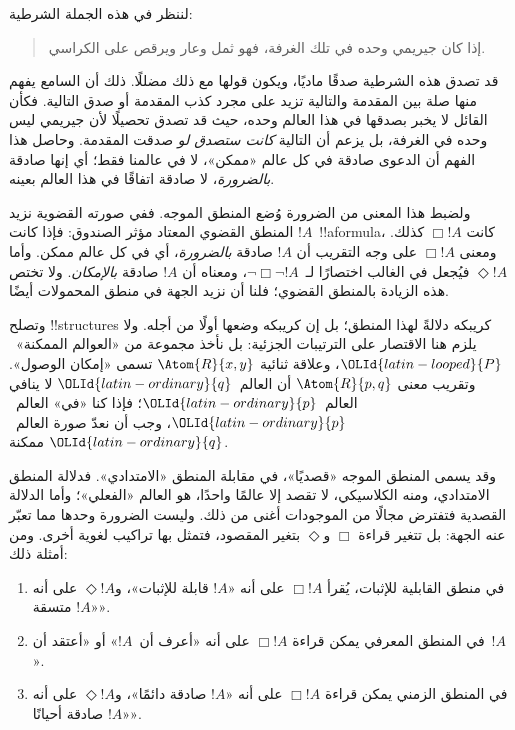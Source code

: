 \documentclass[../../../include/open-logic-section]{subfiles}
\begin{document}


لننظر في هذه الجملة الشرطية:
\begin{quote}
  إذا كان جيريمي وحده في تلك الغرفة، فهو ثمل وعار ويرقص على الكراسي.
\end{quote}
قد تصدق هذه الشرطية صدقًا ماديًا، ويكون قولها مع ذلك مضللًا.
ذلك أن السامع يفهم منها صلة بين المقدمة والتالية تزيد على مجرد
كذب المقدمة أو صدق التالية. فكأن القائل لا يخبر بصدقها في هذا
العالم وحده، حيث قد تصدق تحصيلًا لأن جيريمي ليس وحده في الغرفة،
بل يزعم أن التالية \emph{كانت ستصدق لو} صدقت المقدمة. وحاصل هذا
الفهم أن الدعوى صادقة في كل عالم «ممكن»، لا في عالمنا فقط؛ أي
إنها صادقة \emph{بالضرورة}، لا صادقة اتفاقًا في هذا العالم بعينه.

ولضبط هذا المعنى من الضرورة وُضع المنطق الموجه. ففي صورته القضوية
نزيد المنطق القضوي المعتاد مؤثر الصندوق: فإذا كانت $!A$~!!a{formula}،
كانت $\Box !A$ كذلك. ومعنى $\Box !A$ على وجه التقريب أن
$!A$ صادقة \emph{بالضرورة}، أي في كل عالم ممكن. وأما
$\Diamond !A$ فيُجعل في الغالب اختصارًا لـ~$\lnot \Box \lnot !A$،
ومعناه أن $!A$ صادقة \emph{بالإمكان}. ولا تختص هذه الزيادة
بالمنطق القضوي؛ فلنا أن نزيد الجهة في منطق المحمولات أيضًا.

وتصلح !!{structure}s كريبكه دلالةً لهذا المنطق؛ بل إن كريبكه
وضعها أولًا من أجله. ولا يلزم هنا الاقتصار على الترتيبات الجزئية:
بل نأخذ مجموعة من «العوالم الممكنة»~$\OLId{latin-looped}{P}$، وعلاقة ثنائية
$\Atom{R}{x,y}$ تسمى «إمكان الوصول». وتقريب معنى $\Atom{R}{p,q}$
أن العالم~$\OLId{latin-ordinary}{q}$ لا ينافي العالم~$\OLId{latin-ordinary}{p}$؛ فإذا كنا «في» العالم~$\OLId{latin-ordinary}{p}$،
وجب أن نعدّ صورة العالم~$\OLId{latin-ordinary}{q}$ ممكنة.

وقد يسمى المنطق الموجه «قصديًا»، في مقابلة المنطق «الامتدادي».
فدلالة المنطق الامتدادي، ومنه الكلاسيكي، لا تقصد إلا عالمًا واحدًا،
هو العالم «الفعلي»؛ وأما الدلالة القصدية فتفترض مجالًا من
الموجودات أغنى من ذلك. وليست الضرورة وحدها مما تعبّر عنه الجهة:
بل تتغير قراءة $\Box$ و$\Diamond$ بتغير المقصود، فتمثل بها
تراكيب لغوية أخرى. ومن أمثلة ذلك:
\begin{enumerate}
\item في منطق القابلية للإثبات، يُقرأ $\Box !A$ على أنه «$!A$ قابلة
  للإثبات»، و$\Diamond !A$ على أنه «$!A$ متسقة».
\item في المنطق المعرفي يمكن قراءة $\Box !A$ على أنه «أعرف أن~$!A$»
  أو «أعتقد أن~$!A$».
\item في المنطق الزمني يمكن قراءة $\Box !A$ على أنه «$!A$ صادقة
  دائمًا»، و$\Diamond !A$ على أنه «$!A$ صادقة أحيانًا».
\end{enumerate}
\end{document}
